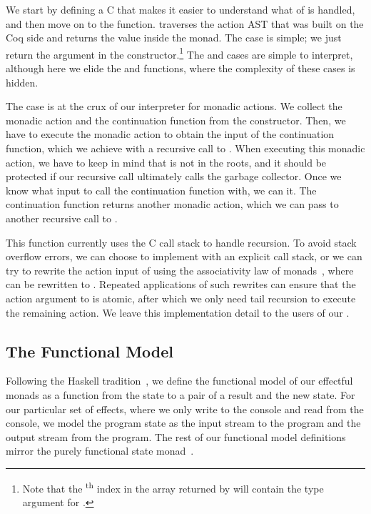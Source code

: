 \newpage
We start by defining a C  that makes it easier to understand what \constructor{} of  is handled, and then move on to the  function.  traverses the action AST that was built on the Coq side and returns the value inside the monad. The  case is simple; we just return the argument in the constructor.\footnote{Note that the \textsuperscript{th} index in the array returned by  will contain the type argument for .} The  and  cases are simple to interpret, although here we elide the  and  functions, where the complexity of these cases is hidden.

The  case is at the crux of our interpreter for monadic actions. We collect the monadic action and the continuation function from the  constructor. Then, we have to execute the monadic action to obtain the input of the continuation function, which we achieve with a recursive call to . When executing this monadic action, we have to keep in mind that  is not in the roots, and it should be protected if our recursive call ultimately calls the garbage collector. Once we know what input to call the continuation function with, we can  it. The continuation function returns another monadic action, which we can pass to another recursive call to .

This function currently uses the C call stack to handle recursion. To avoid stack overflow errors, we can choose to implement  with an explicit call stack, or we can try to rewrite the action input of  using the associativity law of monads~\cite{wadler1992essence}, where \, can be rewritten to . Repeated applications of such rewrites can ensure that the action argument to  is atomic, after which we only need tail recursion to execute the remaining action. We leave this implementation detail to the users of our \ffi{}.

\subsection{The Functional Model}

Following the Haskell tradition~\cite{peytonjones1993imperative}, we define the \gls{functional model} of our effectful monads as a function from the state to a pair of a result and the new state. For our particular set of effects, where we only write to the console and read from the console, we model the program state as the input stream to the program and the output stream from the program. The rest of our \gls{functional model} definitions mirror the purely functional state monad~\cite{jones1995functional}.


